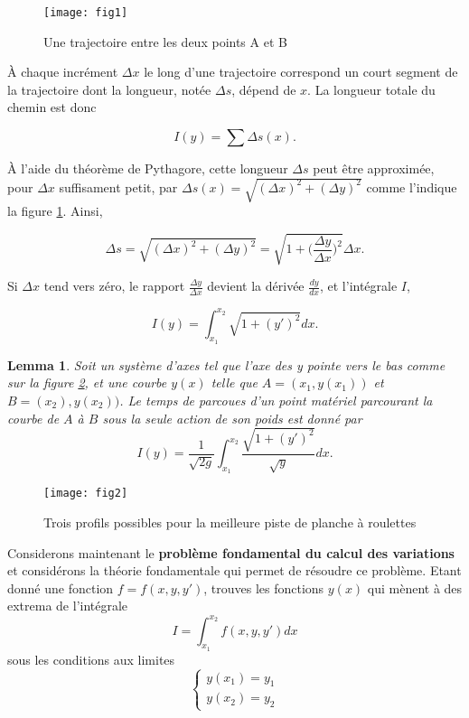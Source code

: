 \documentclass[10pt,a4paper]{article}%
\theoremstyle{theorem}
\newtheorem{lemma}{Lemma}
\theoremstyle{definition}
\begin{document}
	\begin{figure}[h]
		\begin{center}
			\texttt{[image: fig1]}
		\end{center}
		\caption{Une trajectoire entre les deux points A et B}\label{chemin.figure}
	\end{figure}
	
	
	À chaque incrément $\Delta x$ le long d'une trajectoire correspond un court segment de la trajectoire dont la longueur, notée $\Delta s$, dépend de $x$. La longueur totale du chemin est donc
	
	\[I(y)=\sum \Delta s(x).\]
	
	À l'aide du théorème de Pythagore, cette longueur $\Delta s$ peut être approximée, pour $\Delta x$ suffisament petit, par $\Delta s(x)=\sqrt{(\Delta x)^2+(\Delta y)^2}$ comme l'indique la figure \ref{chemin.figure}. Ainsi, 
	
	\[\Delta s=\sqrt{(\Delta x)^2+(\Delta y)^2}=\sqrt{1+\big(\frac{\Delta y}{\Delta x}\big)^2}\Delta x.\]
	
	Si $\Delta x$ tend vers zéro, le rapport $\frac{\Delta y}{\Delta x}$ devient la dérivée $\frac{dy}{dx}$, et l'intégrale $I$,
	
	\begin{equation}\label{eq1}
		I(y)=\int_{x_1}^{x_2}\sqrt{1+(y')^2}dx.
	\end{equation}
	
	\begin{lemma}
		Soit un système d'axes tel que l'axe des y pointe vers le bas comme sur la figure \ref{lemma.figure}, et une courbe $y(x)$ telle que $A=(x_1,y(x_1))$ et $B=(x_2),y(x_2))$. Le temps de parcoues d'un point matériel parcourant la courbe de $A$ à $B$ sous la seule action de son poids est donné par 
		\begin{equation}\label{eq2}
			I(y)=\frac{1}{\sqrt{2g}}\int_{x_1}^{x_2}\frac{\sqrt{1+(y')^2}}{\sqrt{y}}dx.
		\end{equation}
	\end{lemma}
	
	\begin{figure}[h]
		\begin{center}
			\texttt{[image: fig2]}
		\end{center}
	\caption[]{Trois profils possibles pour la meilleure piste de planche à roulettes}\label{lemma.figure}
	\end{figure}


	Considerons maintenant le \textbf{problème fondamental du calcul des variations} et considérons la théorie fondamentale qui permet de résoudre  ce problème.
	Etant donné une fonction $f=f(x,y,y')$, trouves les fonctions $y(x)$ qui mènent à des extrema de l'intégrale \[I=\int_{x_1}^{x_2} f(x,y,y')dx\] sous les conditions aux limites 
	\begin{equation*}
		\begin{cases}
			y(x_1)=y_1
		 	\\
			y(x_2)=y_2
		\end{cases}
	\end{equation*}
		 
\end{document}

